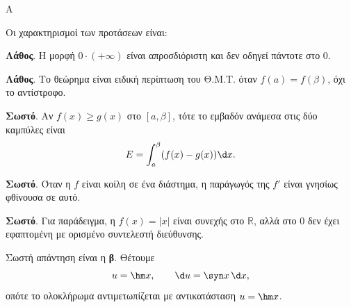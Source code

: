 \begin{thema}{Α}
\begin{erwthma}
\item {}

\item {}

\item {}

\item Οι χαρακτηρισμοί των προτάσεων είναι:
\begin{alist}
\item \textbf{Λάθος}. Η μορφή $0\cdot(+\infty)$ είναι απροσδιόριστη και δεν οδηγεί πάντοτε στο $0$.
\item \textbf{Λάθος}. Το θεώρημα  είναι ειδική περίπτωση του Θ.Μ.Τ. όταν $f(a)=f(\beta)$, όχι το αντίστροφο.
\item \textbf{Σωστό}. Αν $f(x)\geq g(x)$ στο $[a,\beta]$, τότε το εμβαδόν ανάμεσα στις δύο καμπύλες είναι
\[ E=\dint_a^\beta (f(x)-g(x))\d x. \]
\item \textbf{Σωστό}. Όταν η $f$ είναι κοίλη σε ένα διάστημα, η παράγωγός της $f'$ είναι γνησίως φθίνουσα σε αυτό.
\item \textbf{Σωστό}. Για παράδειγμα, η $f(x)=|x|$ είναι συνεχής στο $\mathbb{R}$, αλλά στο $0$ δεν έχει εφαπτομένη με ορισμένο συντελεστή διεύθυνσης.
\end{alist}

\item Σωστή απάντηση είναι η \textbf{β}. Θέτουμε
\[ u=\hm x,\qquad \d u=\syn x\,\d x, \]
οπότε το ολοκλήρωμα αντιμετωπίζεται με αντικατάσταση $u=\hm x$.
\end{erwthma}
\end{thema}

